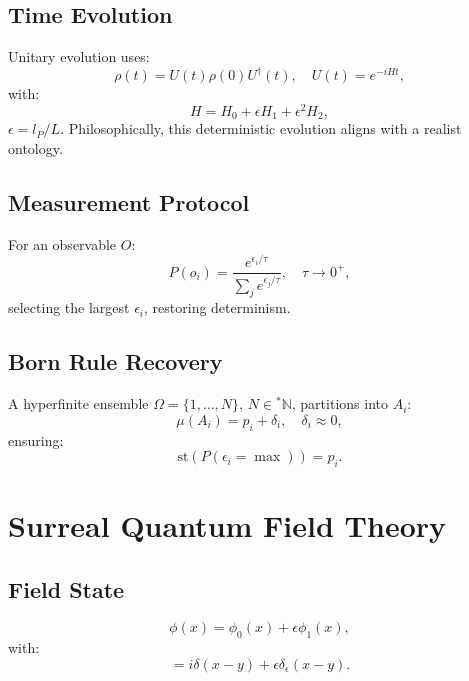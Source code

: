 \documentclass{article}
\begin{document}
\subsection{Time Evolution}
Unitary evolution uses:
\begin{equation}
\rho(t) = U(t) \rho(0) U^\dagger(t), \quad U(t) = e^{-i H t},
\end{equation}
with:
\begin{equation}
H = H_0 + \epsilon H_1 + \epsilon^2 H_2,
\end{equation}
\(\epsilon = l_P / L\). Philosophically, this deterministic evolution aligns with a realist ontology.

\subsection{Measurement Protocol}
For an observable \(O\):
\begin{equation}
P(o_i) = \frac{e^{\epsilon_i / \tau}}{\sum_j e^{\epsilon_j / \tau}}, \quad \tau \to 0^+,
\end{equation}
selecting the largest \(\epsilon_i\), restoring determinism.

\subsection{Born Rule Recovery}
A hyperfinite ensemble \(\Omega = \{1, \dots, N\}\), \(N \in {}^*\mathbb{N}\), partitions into \(A_i\):
\begin{equation}
\mu(A_i) = p_i + \delta_i, \quad \delta_i \approx 0,
\end{equation}
ensuring:
\begin{equation}
\text{st}(P(\epsilon_i = \max)) = p_i.
\end{equation}

\section{Surreal Quantum Field Theory}
\subsection{Field State}
\begin{equation}
\phi(x) = \phi_0(x) + \epsilon \phi_1(x),
\end{equation}
with:
\begin{equation}
[\phi(x), \pi(y)] = i \delta(x-y) + \epsilon \delta_\epsilon(x-y).
\end{equation}
\end{document}
